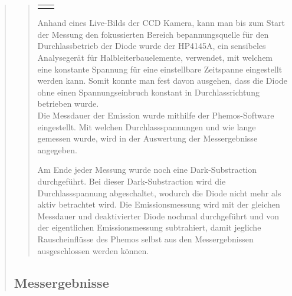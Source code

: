 \begin{quote}
\begin{quote}
\begin{center}
\begin{tabular}{ll}
\begin{minipage}{0.6\textwidth}
                    \end{minipage}

                \end{tabular}
                \end{center}

        \vspace{2em}

        Anhand eines Live-Bilds der CCD Kamera, kann man bis zum Start der
        Messung den fokussierten Bereich bepannungsquelle für den
        Durchlassbetrieb der Diode wurde der HP4145A, ein sensibeles
        Analysegerät für Halbleiterbauelemente, verwendet, mit welchem eine
        konstante Spannung für eine einstellbare Zeitspanne eingestellt werden
        kann. Somit konnte man fest davon ausgehen, dass die Diode ohne einen
        Spannungseinbruch konstant in Durchlassrichtung betrieben wurde.\\
        Die Messdauer der Emission wurde mithilfe der Phemos-Software
        eingestellt. Mit welchen Durchlassspannungen und wie lange gemessen
        wurde, wird in der Auswertung der Messergebnisse angegeben.

        \vspace{1em}

        Am Ende jeder Messung wurde noch eine Dark-Substraction durchgeführt.
        Bei dieser Dark-Substraction wird die Durchlassspannung abgeschaltet,
        wodurch die Diode nicht mehr als aktiv betrachtet wird. Die Emissionsmessung wird mit der
        gleichen Messdauer und deaktivierter Diode nochmal durchgeführt und von
        der eigentlichen Emissionsmessung subtrahiert, damit jegliche
        Rauscheinflüsse des Phemos selbst aus den Messergebnissen ausgeschlossen
        werden können.

        \end{quote}

        \subsection{Messergebnisse}
        \begin{quote}


\end{quote}
\end{quote}
